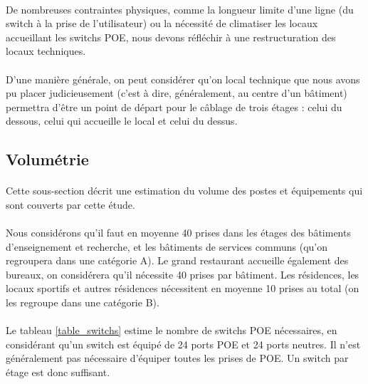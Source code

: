 \paragraph{} De nombreuses contraintes physiques, comme la longueur limite d'une
ligne (du switch à la prise de l'utilisateur) ou la nécessité de climatiser les
locaux accueillant les switchs \ac{POE}, nous devons réfléchir à une
restructuration des locaux techniques.

\paragraph{} D'une manière générale, on peut considérer qu'on local technique
que nous avons pu placer judicieusement (c'est à dire, généralement, au centre
d'un bâtiment) permettra d'être un point de départ pour le câblage de trois
étages : celui du dessous, celui qui accueille le local et celui du dessus.

\subsection{Volumétrie}

\paragraph{} Cette sous-section décrit une estimation du volume des postes et
équipements qui sont couverts par cette étude.

\paragraph{} Nous considérons qu'il faut en moyenne 40 prises dans les étages
des bâtiments d'enseignement et recherche, et les bâtiments de services communs
(qu'on regroupera dans une catégorie A).
Le grand restaurant accueille également des bureaux, on considérera
qu'il nécessite 40 prises par bâtiment. Les résidences, les locaux sportifs et
autres résidences nécessitent en moyenne 10 prises au total (on les regroupe
    dans une catégorie B).

\paragraph{} Le tableau \ref{table_switchs} estime le nombre de switchs \ac{POE}
nécessaires, en considérant qu'un switch est équipé de 24 ports \ac{POE} et 24
ports neutres. Il n'est généralement pas nécessaire d'équiper toutes les prises
de \ac{POE}. Un switch par étage est donc suffisant.


